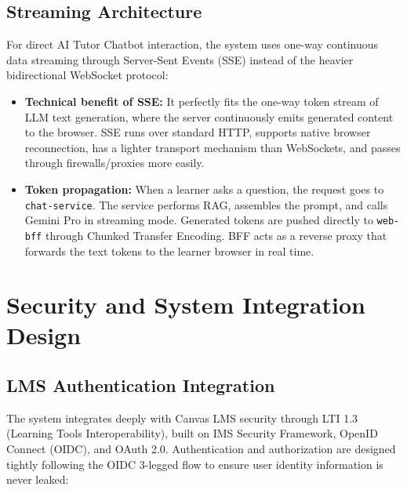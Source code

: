 \subsection{Streaming Architecture}

For direct AI Tutor Chatbot interaction, the system uses one-way
continuous data streaming through Server-Sent Events (SSE) instead of the
heavier bidirectional WebSocket protocol:

\begin{itemize}
    \item \textbf{Technical benefit of SSE:} It perfectly fits the
          one-way token stream of LLM text generation, where the server
          continuously emits generated content to the browser. SSE runs
          over standard HTTP, supports native browser reconnection, has a
          lighter transport mechanism than WebSockets, and passes through
          firewalls/proxies more easily.
    \item \textbf{Token propagation:} When a learner asks a question, the
          request goes to \texttt{chat-service}. The service performs RAG,
          assembles the prompt, and calls Gemini Pro in streaming mode.
          Generated tokens are pushed directly to \texttt{web-bff} through
          Chunked Transfer Encoding. BFF acts as a reverse proxy that
          forwards the text tokens to the learner browser in real time.
\end{itemize}

\section{Security and System Integration Design}

\subsection{LMS Authentication Integration}

The system integrates deeply with Canvas LMS security through LTI 1.3
(Learning Tools Interoperability), built on IMS Security Framework,
OpenID Connect (OIDC), and OAuth 2.0. Authentication and authorization
are designed tightly following the OIDC 3-legged flow to ensure user
identity information is never leaked:

